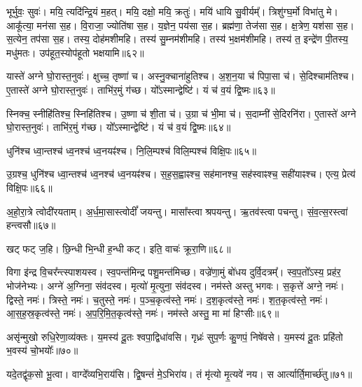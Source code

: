 भूर्भुवः॒ सुवः॑। 
मयि॒ त्यदि॑न्द्रि॒यं म॒हत्। 
मयि॒ दक्षो॒ मयि॒ क्रतुः॑। 
मयि॑ धायि सु॒वीर्यम्᳚। 
त्रिशु॑ग्घ॒र्मो विभा॑तु मे। 
आकू᳚त्या॒ मन॑सा स॒ह। 
वि॒राजा॒ ज्योति॑षा स॒ह। 
य॒ज्ञेन॒ पय॑सा स॒ह। 
ब्रह्म॑णा॒ तेज॑सा स॒ह। 
क्ष॒त्रेण॒ यश॑सा स॒ह। 
स॒त्येन॒ तप॑सा स॒ह। 
तस्य॒ दोह॑मशीमहि। 
तस्य॑ सु॒म्नम॑शीमहि। 
तस्य॑ भ॒क्षम॑शीमहि। 
तस्य॑ त॒ इन्द्रे॑ण पी॒तस्य॒ मधु॑मतः। 
उप॑हूत॒स्योप॑हूतो भक्षयामि॥६२॥
\anuvakamend[यश॑सा स॒ह षट्च॑]

यास्ते॑ अग्ने घो॒रास्त॒नुवः॑। 
क्षुच्च॒ तृष्णा॑ च। 
अस्नु॒क्चाना॑हुतिश्च। 
अ॒श॒न॒या च॑ पिपा॒सा च॑। 
से॒दिश्चाम॑तिश्च। 
ए॒तास्ते॑ अग्ने घो॒रास्त॒नुवः॑। 
ताभि॑र॒मुं ग॑च्छ। 
यो᳚ऽस्मान्द्वेष्टि॑। 
यं च॑ व॒यं द्वि॒ष्मः॥६३॥
\anuvakamend

स्निक्च॒ स्नीहि॑तिश्च॒ स्निहि॑तिश्च। 
उ॒ष्णा च॑ शी॒ता च॑। 
उ॒ग्रा च॑ भी॒मा च॑। 
स॒दाम्नी॑ से॒दिरनि॑रा। 
ए॒तास्ते॑ अग्ने घो॒रास्त॒नुवः॑। 
ताभि॑र॒मुं ग॑च्छ। 
यो᳚ऽस्मान्द्वेष्टि॑। 
यं च॑ व॒यं द्वि॒ष्मः॥६४॥
\anuvakamend

धुनि॑श्च ध्वा॒न्तश्च॑ ध्व॒नश्च॑ ध्व॒नयꣴ॑श्च। 
नि॒लि॒म्पश्च॑ विलि॒म्पश्च॑ विक्षि॒पः॥६५॥
\anuvakamend

उ॒ग्रश्च॒ धुनि॑श्च ध्वा॒न्तश्च॑ ध्व॒नश्च॑ ध्व॒नयꣴ॑श्च। 
स॒ह॒स॒ह्वाꣴश्च॒ सह॑मानश्च॒ सह॑स्वाꣴश्च॒ सही॑याꣴश्च। 
एत्य॒ प्रेत्य॑ विक्षि॒पः॥६६॥
\anuvakamend


अ॒हो॒रा॒त्रे त्वोदी॑रयताम्। 
अ॒र्ध॒मा॒सास्त्वोदीं᳚ जयन्तु। 
मासा᳚स्त्वा श्रपयन्तु। 
ऋ॒तव॑स्त्वा पचन्तु। 
सं॒व॒त्स॒रस्त्वा॑ हन्त्वसौ॥६७॥
\anuvakamend

खट् फट् ज॒हि। 
छि॒न्धी भि॒न्धी ह॒न्धी कट्। 
इति॒ वाचः॑ क्रूरा॒णि॥६८॥
\anuvakamend

विगा इ॑न्द्र वि॒चर᳚न्त्स्पाशयस्व। 
स्व॒पन्त॑मिन्द्र पशु॒मन्त॑मिच्छ। 
वज्रे॑णा॒मुं बो॑धय दुर्वि॒दत्रम्᳚। 
स्व॒प॒तो᳚ऽस्य॒ प्रह॑र॒ भोज॑नेभ्यः। 
अग्ने॑ अ॒ग्निना॒ संव॑दस्व। 
मृत्यो॑ मृ॒त्युना॒ संव॑दस्व। 
नम॑स्ते अस्तु भगवः। 
स॒कृत्ते॑ अग्ने॒ नमः॑। 
द्विस्ते॒ नमः॑। 
त्रिस्ते॒ नमः॑। 
च॒तुस्ते॒ नमः॑। 
प॒ञ्च॒कृत्व॑स्ते॒ नमः॑। 
द॒श॒कृत्व॑स्ते॒ नमः॑। 
श॒त॒कृत्व॑स्ते॒ नमः॑। 
आ॒स॒ह॒स्र॒कृत्व॑स्ते॒ नमः॑। 
अ॒प॒रि॒मि॒त॒कृत्व॑स्ते॒ नमः॑। 
नम॑स्ते अस्तु॒ मा मा॑ हिꣳसीः॥६९॥
\anuvakamend[त्रिस्ते॒ नमः॑ स॒प्त च॑]

असृ॑न्मुखो रुधि॒रेणा॒व्य॑क्तः। 
य॒मस्य॑ दू॒तः  श्वपा॒द्विधा॑वसि। 
गृध्रः॑ सुप॒र्णः कु॒णपं॒ निषे॑वसे। 
य॒मस्य॑ दू॒तः प्रहि॑तो भ॒वस्य॑ चो॒भयोः᳚॥७०॥
\anuvakamend

यदे॒तद्वृ॑क॒सो भू॒त्वा। 
वाग्दे᳚व्यभि॒राय॑सि। 
द्वि॒षन्तं॑ मे॒ऽभिरा॑य। 
तं मृ॑त्यो मृ॒त्यवे॑ नय। 
स आर्त्यार्ति॒मार्च्छ॑तु॥७१॥
\anuvakamend

